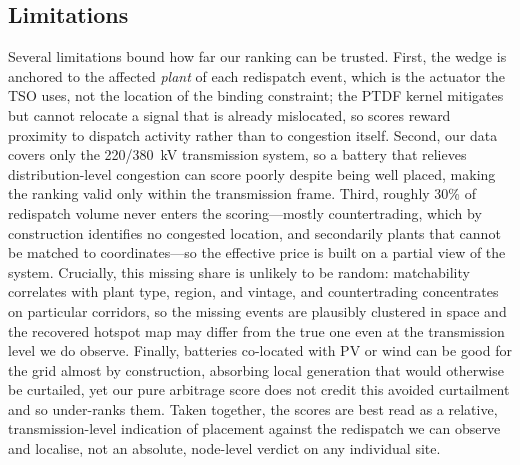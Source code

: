 \subsection{Limitations}
\label{sec:limitations}

Several limitations bound how far our ranking can be trusted. First, the wedge is
anchored to the affected \emph{plant} of each redispatch event, which is the
actuator the TSO uses, not the location of the binding constraint; the PTDF kernel
mitigates but cannot relocate a signal that is already mislocated, so scores reward
proximity to dispatch activity rather than to congestion itself. Second, our data
covers only the 220/380~kV transmission system, so a battery that relieves
distribution-level congestion can score poorly despite being well placed, making
the ranking valid only within the transmission frame. Third, roughly 30\% of
redispatch volume never enters the scoring---mostly countertrading, which by
construction identifies no congested location, and secondarily plants that cannot
be matched to coordinates---so the effective price is built on a partial view of
the system. Crucially, this missing share is unlikely to be random: matchability
correlates with plant type, region, and vintage, and countertrading concentrates on
particular corridors, so the missing events are plausibly clustered in space and the
recovered hotspot map may differ from the true one even at the transmission level we
do observe. Finally, batteries co-located with PV or wind can be good for the grid
almost by construction, absorbing local generation that would otherwise be curtailed,
yet our pure arbitrage score does not credit this avoided curtailment and so
under-ranks them. Taken together, the scores are best read as a relative,
transmission-level indication of placement against the redispatch we can observe and
localise, not an absolute, node-level verdict on any individual site.
